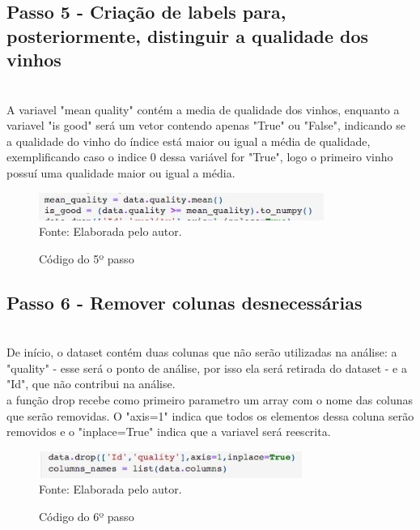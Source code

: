 \documentclass[a4paper, 12pt]{article}
\begin{document}
\newpage
\subsection{Passo 5 - Criação de labels para, posteriormente, distinguir a qualidade dos vinhos}

\\A variavel "mean quality" contém a media de qualidade dos vinhos, enquanto a variavel "is good"
será um vetor contendo apenas "True" ou "False", indicando se a qualidade do vinho do índice está
maior ou igual a média de qualidade, exemplificando caso o indice 0 dessa variável for "True", logo
o primeiro vinho possuí uma qualidade maior ou igual a média.

 \begin{figure}[!ht]
        \centering
        \caption{Código do 5º passo}
        \includegraphics[scale=0.5]{passo5.jpg} \\
        {\footnotesize Fonte: Elaborada pelo autor.}
        \label{fig:my_label}
    \end{figure}

\subsection{Passo 6 - Remover colunas desnecessárias}

\\De início, o dataset contém duas colunas que não serão utilizadas na análise: a "quality" - esse será o ponto de análise, por isso ela será retirada do dataset -
e a "Id", que não contribui na análise.
\\a função drop recebe como primeiro parametro um array com o nome das colunas que serão removidas. O "axis=1" indica que todos os elementos dessa coluna serão removidos e o "inplace=True" indica
que a variavel será reescrita.
 \begin{figure}[!ht]
        \centering
        \caption{Código do 6º passo}
        \includegraphics[scale=0.5]{passo6.jpg} \\
        {\footnotesize Fonte: Elaborada pelo autor.}
        \label{fig:my_label}
    \end{figure}
\end{document}
